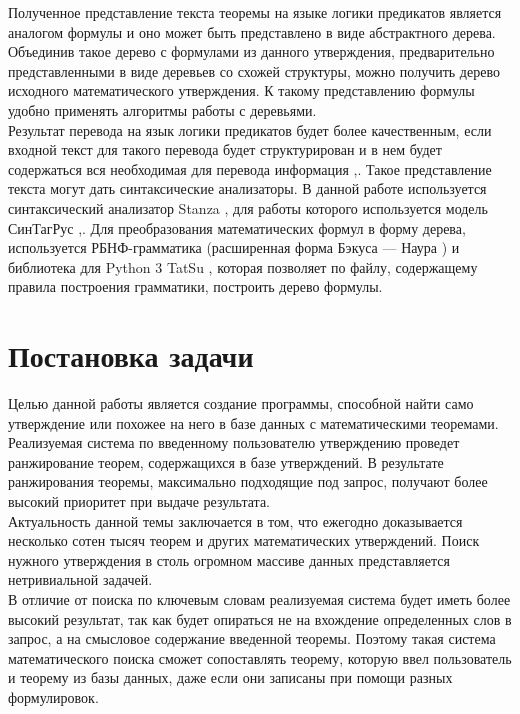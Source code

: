 \documentclass[12pt]{article}
\begin{document}
Полученное представление текста теоремы на языке логики предикатов является аналогом формулы и оно может быть представлено в виде абстрактного дерева. Объединив такое дерево с формулами из данного утверждения, предварительно представленными в виде деревьев со схожей структуры,  можно получить дерево исходного математического утверждения. К такому представлению формулы удобно применять алгоритмы работы с деревьями.\\

Результат перевода на язык логики предикатов будет более качественным, если входной текст для такого перевода будет структурирован и в нем будет содержаться вся необходимая для перевода информация \cite{author11},\cite{author12}. Такое представление текста могут дать синтаксические анализаторы. В данной работе используется синтаксический анализатор Stanza \cite{author14}, для работы которого используется модель СинТагРус \cite{author17},\cite{apseyan}. Для преобразования математических формул в форму дерева, используется РБНФ-грамматика (расширенная форма Бэкуса — Наура \cite{author13}) и библиотека для Python 3 TatSu \cite{author16}, которая позволяет по файлу, содержащему правила построения грамматики, построить дерево формулы.

\newpage
\section*{Постановка задачи}

Целью данной работы является создание программы, способной найти само утверждение или похожее на него в базе данных с математическими теоремами.\\

Реализуемая система по введенному пользователю утверждению проведет ранжирование теорем, содержащихся в базе утверждений. В результате ранжирования теоремы, максимально подходящие под запрос, получают более высокий приоритет при выдаче результата. \\

Актуальность данной темы заключается в том, что ежегодно доказывается несколько сотен тысяч теорем и других математических утверждений. Поиск нужного утверждения в столь огромном массиве данных представляется нетривиальной задачей.\\

В отличие от поиска по ключевым словам реализуемая система будет иметь более высокий результат, так как будет опираться не на вхождение определенных слов в запрос, а на смысловое содержание введенной теоремы. Поэтому такая система математического поиска сможет сопоставлять теорему, которую ввел пользователь и теорему из базы данных, даже если они записаны при помощи разных формулировок.  \\
\end{document}

